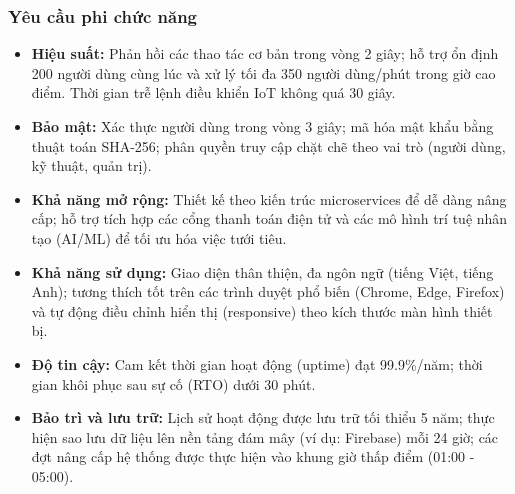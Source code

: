 \subsubsection{Yêu cầu phi chức năng}
\begin{itemize}
    \item \textbf{Hiệu suất:} Phản hồi các thao tác cơ bản trong vòng 2 giây; hỗ trợ ổn định 200 người dùng cùng lúc và xử lý tối đa 350 người dùng/phút trong giờ cao điểm. Thời gian trễ lệnh điều khiển IoT không quá 30 giây.
    \item \textbf{Bảo mật:} Xác thực người dùng trong vòng 3 giây; mã hóa mật khẩu bằng thuật toán SHA-256; phân quyền truy cập chặt chẽ theo vai trò (người dùng, kỹ thuật, quản trị).
    \item \textbf{Khả năng mở rộng:} Thiết kế theo kiến trúc microservices để dễ dàng nâng cấp; hỗ trợ tích hợp các cổng thanh toán điện tử và các mô hình trí tuệ nhân tạo (AI/ML) để tối ưu hóa việc tưới tiêu.
    \item \textbf{Khả năng sử dụng:} Giao diện thân thiện, đa ngôn ngữ (tiếng Việt, tiếng Anh); tương thích tốt trên các trình duyệt phổ biến (Chrome, Edge, Firefox) và tự động điều chỉnh hiển thị (responsive) theo kích thước màn hình thiết bị.
    \item \textbf{Độ tin cậy:} Cam kết thời gian hoạt động (uptime) đạt 99.9\%/năm; thời gian khôi phục sau sự cố (RTO) dưới 30 phút.
    \item \textbf{Bảo trì và lưu trữ:} Lịch sử hoạt động được lưu trữ tối thiểu 5 năm; thực hiện sao lưu dữ liệu lên nền tảng đám mây (ví dụ: Firebase) mỗi 24 giờ; các đợt nâng cấp hệ thống được thực hiện vào khung giờ thấp điểm (01:00 - 05:00).
\end{itemize}